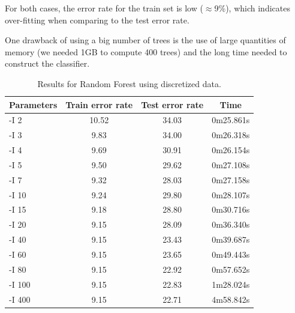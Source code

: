 \documentclass[a4paper]{llncs}
\begin{document}
For both cases, the error rate for the train set is low ($\approx$9\%), which indicates over-fitting
when comparing to the test error rate.

One drawback of using a big number of trees is the use of large
quantities of memory (we needed 1GB to compute 400 trees) and the long time needed to construct the classifier.

\begin{table}[ht]
  \begin{center}
  \begin{tabular}{ | l | c | c | c |}
    \hline
    \textbf{Parameters} & \textbf{Train error rate} & \textbf{Test error rate} & \textbf{Time} \\ \hline
    -I 2 & 10.52 & 34.03 & 0m25.861s \\ \hline
    -I 3 & 9.83 & 34.00 & 0m26.318s \\ \hline
    -I 4 & 9.69 & 30.91 & 0m26.154s \\ \hline
    -I 5 & 9.50 & 29.62 & 0m27.108s \\ \hline
    -I 7 & 9.32 & 28.03 & 0m27.158s \\ \hline
    -I 10 & 9.24 & 29.80 & 0m28.107s \\ \hline
    -I 15 & 9.18 & 28.80 & 0m30.716s \\ \hline
    -I 20 & 9.15 & 28.09 & 0m36.340s \\ \hline
    -I 40 & 9.15 & 23.43 & 0m39.687s \\ \hline
    -I 60 & 9.15 & 23.65 & 0m49.443s \\ \hline
    -I 80 & 9.15 & 22.92 & 0m57.652s \\ \hline
    -I 100 & 9.15 & 22.83 & 1m28.024s \\ \hline
    -I 400 & 9.15 & 22.71 & 4m58.842s \\ \hline
  \end{tabular}
  \caption{Results for Random Forest using discretized data.}
  \label{tbl:results_random_forest_discr}
  \end{center}
\end{table}
\end{document}
